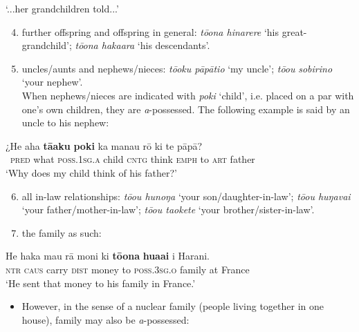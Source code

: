 \glt 
‘...her grandchildren told...’ \textstyleExampleref{[R380.007]} 
\z

\begin{enumerate}
\setcounter{enumi}{3}
\item 
further offspring and offspring in general: \textit{tō{\ꞌ}ona hinarere} ‘his great-grandchild’; \textit{tō{\ꞌ}ona hakaara} ‘his descendants’.

\item 
uncles/aunts and nephews/nieces: \textit{tō{\ꞌ}oku pāpātio} ‘my uncle’; \textit{tō{\ꞌ}ou} \textit{sobirino} ‘your nephew’.\\
When nephews/nieces are indicated with \textit{poki} ‘child’, i.e. placed on a par with one’s own children, they are \textit{a}{}-possessed. The following example is said by an uncle to his nephew:

\end{enumerate}

\ea\label{ex:6.61}
\gll ¿He aha \textbf{tā{\ꞌ}aku} \textbf{poki} ka mana{\ꞌ}u rō ki te pāpā? \\
~\textsc{pred} what \textsc{poss.1sg.a} child \textsc{cntg} think \textsc{emph} to \textsc{art} father \\

\glt 
‘Why does my child think of his father?’ \textstyleExampleref{[R230.026]} 
\z

\begin{enumerate}
\setcounter{enumi}{5}
\item 
all in-law relationships: \textit{tō{\ꞌ}ou hunoŋa} ‘your son/daughter-in-law’; \textit{tō{\ꞌ}ou huŋavai} ‘your father/mother-in-law’; \textit{tō{\ꞌ}ou ta{\ꞌ}okete} ‘your brother/sister-in-law’.

\item 
the family as such:

\end{enumerate}

\ea\label{ex:6.62}
\gll He haka ma{\ꞌ}u rā moni ki \textbf{tō{\ꞌ}ona} \textbf{hua{\ꞌ}ai} {\ꞌ}i Harani. \\
\textsc{ntr} \textsc{caus} carry \textsc{dist} money to \textsc{poss.3sg.o} family at France \\

\glt
‘He sent that money to his family in France.’ \textstyleExampleref{[R231.013]} 
\z

\begin{itemize}
\item[]
However, in the sense of a nuclear family (people living together in one house), family may also be \textit{a}{}-possessed:
\end{itemize}


